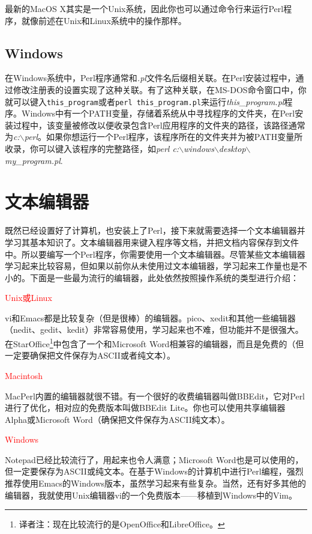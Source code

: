 最新的MacOS X其实是一个Unix系统，因此你也可以通过命令行来运行Perl程序，就像前述在Unix和Linux系统中的操作那样。

\subsection{Windows}
在Windows系统中，Perl程序通常和\textit{.pl}文件名后缀相关联。在Perl安装过程中，通过修改注册表的设置实现了这种关联。有了这种关联，在MS-DOS命令窗口中，你就可以键入\verb|this_program|或者\verb|perl this_program.pl|来运行\textit{this\_program.pl}程序。Windows中有一个PATH变量，存储着系统从中寻找程序的文件夹，在Perl安装过程中，该变量被修改以便收录包含Perl应用程序的文件夹的路径，该路径通常为\textit{c:$\backslash$perl}。如果你想运行一个Perl程序，该程序所在的文件夹并为被PATH变量所收录，你可以键入该程序的完整路径，如\textit{perl c:$\backslash$windows$\backslash$desktop$\backslash$my\_program.pl}.

\section{文本编辑器}
既然已经设置好了计算机，也安装上了Perl，接下来就需要选择一个文本编辑器并学习其基本知识了。文本编辑器用来键入程序等文档，并把文档内容保存到文件中。所以要编写一个Perl程序，你需要使用一个文本编辑器。尽管某些文本编辑器学习起来比较容易，但如果以前你从未使用过文本编辑器，学习起来工作量也是不小的。下面是一些最为流行的编辑器，此处依然按照操作系统的类型进行介绍：

\noindent
\textcolor{red}{Unix或Linux}
\begin{adjustwidth}{4em}{}
vi和Emacs都是比较复杂（但是很棒）的编辑器。pico、xedit和其他一些编辑器（nedit、gedit、kedit）非常容易使用，学习起来也不难，但功能并不是很强大。在StarOffice\footnote{译者注：现在比较流行的是OpenOffice和LibreOffice。}中包含了一个和Microsoft Word相兼容的编辑器，而且是免费的（但一定要确保把文件保存为ASCII或者纯文本）。
\end{adjustwidth}

\noindent
\textcolor{red}{Macintosh}
\begin{adjustwidth}{4em}{}
MacPerl内置的编辑器就很不错。有一个很好的收费编辑器叫做BBEdit，它对Perl进行了优化，相对应的免费版本叫做BBEdit Lite。你也可以使用共享编辑器Alpha或Microsoft Word（确保把文件保存为ASCII纯文本）。
\end{adjustwidth}

\noindent
\textcolor{red}{Windows}
\begin{adjustwidth}{4em}{}
Notepad已经比较流行了，用起来也令人满意；Microsoft Word也是可以使用的，但一定要保存为ASCII或纯文本。在基于Windows的计算机中进行Perl编程，强烈推荐使用Emacs的Windows版本，虽然学习起来有些复杂。当然，还有好多其他的编辑器，我就使用Unix编辑器vi的一个免费版本——移植到Windows中的Vim。
\end{adjustwidth}

